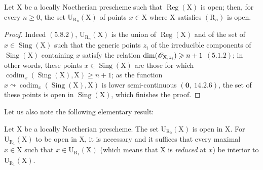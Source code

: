 \begin{proposition}[6.12.9]
\label{IV.6.12.9}
Let $\mathrm{X}$ be a locally Noetherian prescheme such that $\operatorname{Reg}(\mathrm{X})$ is
open; then, for every $n\geqslant 0$, the set $\mathrm{U}_{\mathrm{R}_n}(\mathrm{X})$ of points $x\in\mathrm{X}$ where $\mathrm{X}$ satisfies $(\mathrm{R}_n)$ is open.
\end{proposition}

\begin{proof}
Indeed $(5.8.2)$, $\mathrm{U}_{\mathrm{R}_n}(\mathrm{X})$ is the union of $\operatorname{Reg}(\mathrm{X})$ and of the set of $x\in\operatorname{Sing}(\mathrm{X})$
such that the generic points $z_i$ of the irreducible components of $\operatorname{Sing}(\mathrm{X})$ containing $x$
satisfy the relation $\dim(\mathscr{O}_{\mathrm{X},z_i})\geqslant n+1$ $(5.1.2)$; in other words, these
points $x\in\operatorname{Sing}(\mathrm{X})$ are those for which $\operatorname{codim}_x(\operatorname{Sing}(\mathrm{X}),\mathrm{X})\geqslant n+1$;
as the function $x\leadsto\operatorname{codim}_x(\operatorname{Sing}(\mathrm{X}),\mathrm{X})$ is lower semi-continuous $(\mathbf{0},~14.2.6)$,
the set of these points is open in $\operatorname{Sing}(\mathrm{X})$, which finishes the proof.
\end{proof}

Let us also note the following elementary result:

\begin{proposition}[6.12.10]
\label{IV.6.12.10}
Let $\mathrm{X}$ be a locally Noetherian prescheme. The set $\mathrm{U}_{\mathrm{R}_0}(\mathrm{X})$ is
open in $\mathrm{X}$. For $\mathrm{U}_{\mathrm{R}_1}(\mathrm{X})$ to be open in $\mathrm{X}$, it is necessary and it suffices that every maximal $x\in\mathrm{X}$
such that $x\in\mathrm{U}_{\mathrm{R}_1}(\mathrm{X})$ \textup{(which means that $\mathrm{X}$ is \emph{reduced} at $x$)} be interior to $\mathrm{U}_{\mathrm{R}_1}(\mathrm{X})$.
\end{proposition}

